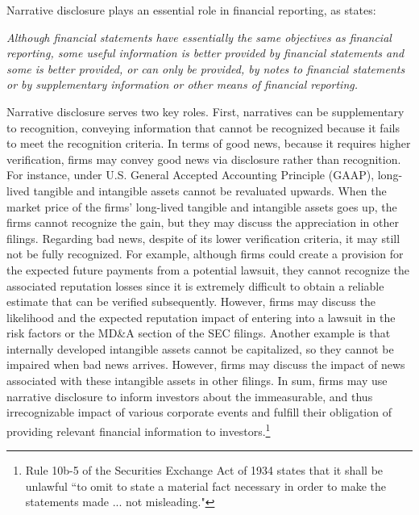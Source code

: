 \documentclass[letterpaper,11pt]{article}
\begin{document}
\begin{spacing}{1.5}
Narrative disclosure plays an essential role in financial reporting, as  states:
\begin{adjustwidth}{1cm}{1cm}
\begin{singlespace}
	\textit{Although financial statements have essentially the same objectives as financial reporting, some useful information is better provided by financial statements and some is better provided, or can only be provided, by notes to financial statements or by supplementary information or other means of financial reporting.}
\end{singlespace}
\end{adjustwidth}
Narrative disclosure serves two key roles. First, narratives can be supplementary to recognition, conveying information that cannot be recognized because it fails to meet the recognition criteria. In terms of good news, because it requires higher verification, firms may convey good news via disclosure rather than recognition. For instance, under U.S. General Accepted Accounting Principle (GAAP), long-lived tangible and intangible assets cannot be revaluated upwards. When the market price of the firms' long-lived tangible and intangible assets goes up, the firms cannot recognize the gain, but they may discuss the appreciation in other filings. Regarding bad news, despite of its lower verification criteria, it may still not be fully recognized. For example, although firms could create a provision for the expected future payments from a potential lawsuit, they cannot recognize the associated reputation losses since it is extremely difficult to obtain a reliable estimate that can be verified subsequently. However, firms may discuss the likelihood and the expected reputation impact of entering into a lawsuit in the risk factors or the MD\&A section of the SEC filings. Another example is that internally developed intangible assets cannot be capitalized, so they cannot be impaired when bad news arrives. However, firms may discuss the impact of news associated with these intangible assets in other filings. In sum, firms may use narrative disclosure to inform investors about the immeasurable, and thus irrecognizable impact of various corporate events and fulfill their obligation of providing relevant financial information to investors.\footnote{Rule 10b-5 of the Securities Exchange Act of 1934 states that it shall be unlawful ``to omit to state a material fact necessary in order to make the statements made ... not misleading."} 


\end{spacing}
\end{document}
